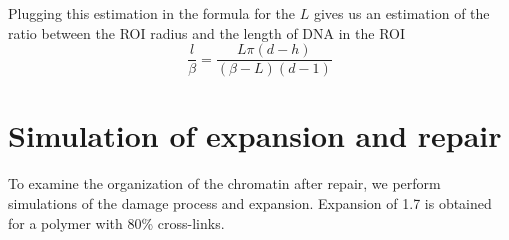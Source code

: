 \documentclass[12pt]{report}
\begin{document}
		Plugging this estimation in the formula for the $L$ gives us an estimation of the ratio between the ROI radius and the length of DNA in the ROI
		\begin{equation}\label{eq:ratioOfDNALengthToRoiRadius}
		\frac{l}{\beta} = \frac{L\pi(d-h)}{(\beta-L)(d-1)}
		\end{equation}				
		
		\section{Simulation of expansion and repair}
		To examine the organization of the chromatin after repair, we perform simulations of the damage process and expansion. Expansion of 1.7 is obtained for a polymer with 80\% cross-links. 
		
		
\end{document}
